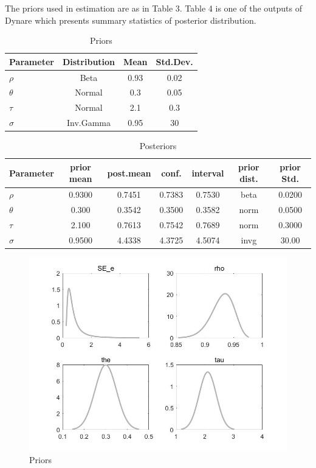 \documentclass[a4paper,12pt]{scrartcl} %
\begin{document}
The priors used in estimation are as in Table 3. Table 4 is one of the outputs of Dynare which presents summary statistics of posterior distribution.

\begin{table}[h]
\centering\caption{Priors}\label{3}
\begin{tabular}{lccc}
  \hline
  Parameter&Distribution&Mean&Std.Dev.\\
  \hline
  $\rho$&Beta&0.93&0.02\\
  $\theta$&Normal&0.3&0.05\\
  $\tau$&Normal&2.1&0.3\\
  $\sigma$&Inv.Gamma&0.95&30\\
  \hline
  \end{tabular}
\end{table}

\begin{table}[h]
\centering\caption{Posteriors}\label{4}
\begin{tabular}{lcccccc}
  \hline
  Parameter&prior mean&post.mean&conf.&interval&prior dist.&prior Std.\\
  \hline
  $\rho$&0.9300&0.7451&0.7383&0.7530&beta&0.0200\\
  $\theta$&0.300&0.3542&0.3500&0.3582&norm&0.0500\\
  $\tau$&2.100&0.7613&0.7542&0.7689&norm&0.3000\\
  $\sigma$&0.9500&4.4338&4.3725&4.5074&invg&30.00\\
  \hline
  \end{tabular}
\end{table}


\begin{figure}[htbp!]
		\centering
			\includegraphics[width=0.7\linewidth]{fig2.jpg}
            \caption{Priors}\label{2}
\end{figure}
\end{document}

